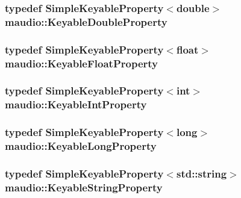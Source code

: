 \hypertarget{namespacemaudio_a82d8d5304e29a8853cfdcec6702ea8c4}{
\subsubsection[{Keyable\-Double\-Property}]{\setlength{\rightskip}{0pt plus 5cm}typedef {\bf Simple\-Keyable\-Property}$<$double$>$ {\bf maudio\-::\-Keyable\-Double\-Property}}}\label{namespacemaudio_a82d8d5304e29a8853cfdcec6702ea8c4}
\hypertarget{namespacemaudio_a55b4e79de26364f071a7f27c6266afd9}{
\subsubsection[{Keyable\-Float\-Property}]{\setlength{\rightskip}{0pt plus 5cm}typedef {\bf Simple\-Keyable\-Property}$<$float$>$ {\bf maudio\-::\-Keyable\-Float\-Property}}}\label{namespacemaudio_a55b4e79de26364f071a7f27c6266afd9}
\hypertarget{namespacemaudio_a8a917c57304d346d99654ef2ad50301e}{
\subsubsection[{Keyable\-Int\-Property}]{\setlength{\rightskip}{0pt plus 5cm}typedef {\bf Simple\-Keyable\-Property}$<$int$>$ {\bf maudio\-::\-Keyable\-Int\-Property}}}\label{namespacemaudio_a8a917c57304d346d99654ef2ad50301e}
\hypertarget{namespacemaudio_a9b05d4e46fdca4bf9572c77653abaab4}{
\subsubsection[{Keyable\-Long\-Property}]{\setlength{\rightskip}{0pt plus 5cm}typedef {\bf Simple\-Keyable\-Property}$<$long$>$ {\bf maudio\-::\-Keyable\-Long\-Property}}}\label{namespacemaudio_a9b05d4e46fdca4bf9572c77653abaab4}
\hypertarget{namespacemaudio_a39666a5b0615d797ffb9206a4024f234}{
\subsubsection[{Keyable\-String\-Property}]{\setlength{\rightskip}{0pt plus 5cm}typedef {\bf Simple\-Keyable\-Property}$<$std\-::string$>$ {\bf maudio\-::\-Keyable\-String\-Property}}}\label{namespacemaudio_a39666a5b0615d797ffb9206a4024f234}
